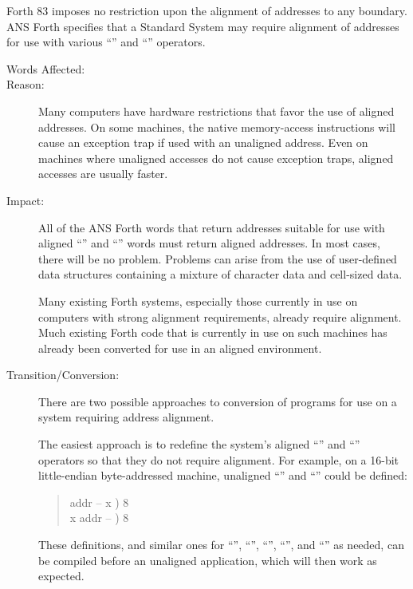 Forth 83 imposes no restriction upon the alignment of addresses to
any boundary. ANS Forth specifies that a Standard System may require
alignment of addresses for use with various ``'' and
``\word{!}'' operators.

\begin{description}
\item[Words Affected:]
	\word{!}	\word{+!}			
			\word{,}

\item[Reason:]
	Many computers have hardware restrictions that favor the use of
	aligned addresses. On some machines, the native memory-access
	instructions will cause an exception trap if used with an
	unaligned address. Even on machines where unaligned accesses do
	not cause exception traps, aligned accesses are usually faster.

\item[Impact:]
	All of the ANS Forth words that return addresses suitable for
	use with aligned ``'' and ``\word{!}'' words must return
	aligned addresses. In most cases, there will be no problem.
	Problems can arise from the use of user-defined data structures
	containing a mixture of character data and cell-sized data.

	Many existing Forth systems, especially those currently in use on
	computers with strong alignment requirements, already require
	alignment. Much existing Forth code that is currently in use on
	such machines has already been converted for use in an aligned
	environment.

\item[Transition/Conversion:]
	There are two possible approaches to conversion of programs for
	use on a system requiring address alignment.

	The easiest approach is to redefine the system's aligned
	``'' and ``\word{!}'' operators so that they do not
	require alignment. For example, on a 16-bit little-endian
	byte-addressed machine, unaligned ``'' and ``\word{!}''
	could be defined:
	\begin{quote}\ttfamily
		\word{:}   addr -- x )
			  
			  8
			 
		\word{;} \\
		\word{:} \word{!}  x addr -- )
			 8 
			 
			\word{C!} 
		\word{;}
	\end{quote}
	These definitions, and similar ones for ``\word{+!}'',
	``'', ``'', ``\word{,}'', and
	``'' as needed, can be compiled before an
	unaligned application, which will then work as expected.


\end{description}
